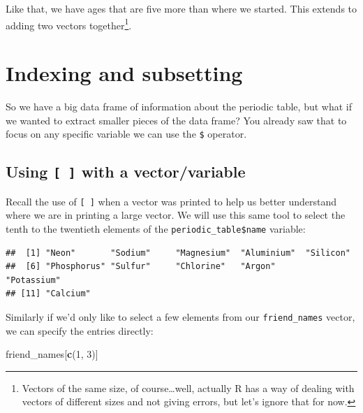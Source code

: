 \documentclass[]{tufte-book}
\newenvironment{Shaded}{\begin{snugshade}}{\end{snugshade}}
\newcommand{\KeywordTok}[1]{\textcolor[rgb]{0.13,0.29,0.53}{\textbf{{#1}}}}
\newcommand{\DecValTok}[1]{\textcolor[rgb]{0.00,0.00,0.81}{{#1}}}
\newcommand{\NormalTok}[1]{{#1}}
\theoremstyle{definition}
\theoremstyle{definition}
\theoremstyle{remark}
\begin{document}
Like that, we have ages that are five more than where we started. This
extends to adding two vectors together\footnote{Vectors of the same
  size, of course\ldots{}well, actually R has a way of dealing with
  vectors of different sizes and not giving errors, but let's ignore
  that for now.}.

\section{Indexing and subsetting}\label{index-sub}

So we have a big data frame of information about the periodic table, but
what if we wanted to extract smaller pieces of the data frame? You
already saw that to focus on any specific variable we can use the
\texttt{\$} operator.

\subsection{\texorpdfstring{Using \texttt{{[}\ {]}} with a
vector/variable}{Using {[} {]} with a vector/variable}}\label{using-with-a-vectorvariable}

Recall the use of \texttt{{[}\ {]}} when a vector was printed to help us
better understand where we are in printing a large vector. We will use
this same tool to select the tenth to the twentieth elements of the
\texttt{periodic\_table\$name} variable:

\begin{Shaded}
\end{Shaded}

\begin{verbatim}
##  [1] "Neon"       "Sodium"     "Magnesium"  "Aluminium"  "Silicon"   
##  [6] "Phosphorus" "Sulfur"     "Chlorine"   "Argon"      "Potassium" 
## [11] "Calcium"
\end{verbatim}

Similarly if we'd only like to select a few elements from our
\texttt{friend\_names} vector, we can specify the entries directly:

\begin{Shaded}
\begin{Highlighting}[]
\NormalTok{friend_names[}\KeywordTok{c}\NormalTok{(}\DecValTok{1}\NormalTok{, }\DecValTok{3}\NormalTok{)]}
\end{Highlighting}
\end{Shaded}
\end{document}
